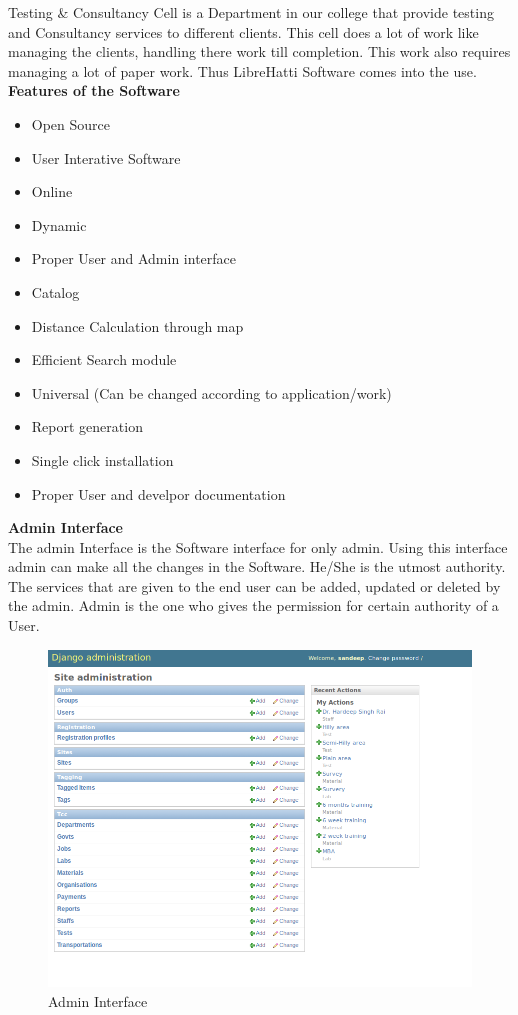 Testing \& Consultancy Cell is a Department in our college that provide 
testing and Consultancy services to different clients. This cell does a 
lot of work like managing the clients, handling there work till 
completion. This work also requires managing a lot of paper work. 
Thus LibreHatti Software comes into the use. \\ 
{\bf Features of the Software}
\begin{itemize}
\item Open Source
\item User Interative Software
\item Online
\item Dynamic
\item Proper User and Admin interface
\item Catalog
\item Distance Calculation through map
\item Efficient Search module
\item Universal (Can be changed according to application/work)
\item Report generation
\item Single click installation
\item Proper User and develpor documentation
\end{itemize}

\newpage
{\bf Admin Interface}\\

The admin Interface is the Software interface for only admin. Using 
this interface admin can make all the changes in the Software. He/She 
is the utmost authority. The services that are given to the end user 
can be added, updated or deleted by the admin. Admin is the one who 
gives the permission for certain authority of a User.\\ 
\begin{figure}[h]
\centering \includegraphics[scale=0.6]{images/admin.png}
\caption{Admin Interface}
\end{figure}

